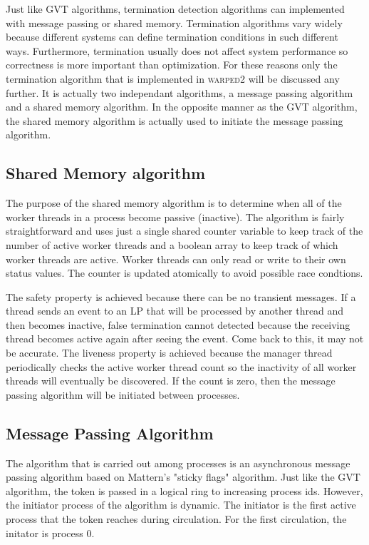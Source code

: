 \documentclass[11pt]{book}
\begin{document}
Just like GVT algorithms, termination detection algorithms can implemented with message
passing or shared memory. Termination algorithms vary widely because different systems
can define termination conditions in such different ways. Furthermore, termination usually
does not affect system performance so correctness is more important than optimization.
For these reasons only the termination algorithm that is implemented in \textsc{warped2}
will be discussed any further. It is actually two independant algorithms, a message passing
algorithm and a shared memory algorithm. In the opposite manner as the GVT algorithm, the
shared memory algorithm is actually used to initiate the message passing algorithm.

\subsection{Shared Memory algorithm}

The purpose of the shared memory algorithm is to determine when all of the worker threads
in a process become passive (inactive). The algorithm is fairly straightforward and uses
just a single shared counter variable to keep track of the number of active worker threads
and a boolean array to keep track of which worker threads are active. Worker threads can
only read or write to their own status values. The counter is updated atomically to avoid
possible race condtions.

The safety property is achieved because there can be no transient messages. If a thread
sends an event to an LP that will be processed by another thread and then becomes inactive,
false termination cannot detected because the receiving thread becomes active again after
seeing the event. Come back to this, it may not be accurate.
The liveness property is achieved because the manager thread periodically checks the
active worker thread count so the inactivity of all worker threads will eventually be
discovered. If the count is zero, then the message passing algorithm will be initiated
between processes.

\subsection{Message Passing Algorithm}

The algorithm that is carried out among processes is an asynchronous message passing
algorithm based on Mattern's "sticky flags" algorithm\cite{mattern-93}. Just like the GVT
algorithm, the token is passed in a logical ring to increasing process ids. However, the
initiator process of the algorithm is dynamic. The initiator is the first active process
that the token reaches during circulation. For the first circulation, the initator is process
0.
\end{document}

